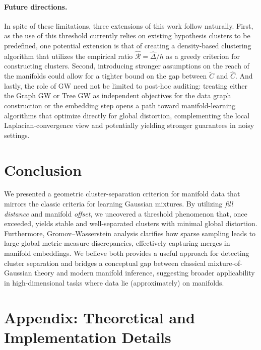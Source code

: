 \documentclass{article}
\theoremstyle{plain}
\theoremstyle{definition}
\theoremstyle{remark}
\begin{document}
\paragraph{Future directions.}
In spite of these limitations, three extensions of this work follow naturally. First, as the use of this threshold currently relies on existing hypothesis clusters to be predefined, one potential extension is that of creating a density-based clustering algorithm that utilizes the empirical ratio \(\widehat{\mathcal{R}}=\widehat{\Delta}/h\) as a greedy criterion for constructing clusters.
Second, introducing stronger assumptions on the reach of the manifolds could allow for a tighter bound on the gap between \(\widetilde{C}\) and \(\widehat{C}\). And lastly, the role of GW need not be limited to post-hoc auditing: treating either the Graph GW or Tree GW as independent objectives for the data graph construction or the embedding step opens a path toward manifold-learning algorithms that optimize directly for global distortion, complementing the local Laplacian-convergence view and potentially yielding stronger guarantees in noisy settings.

\section{Conclusion}
\label{sec:conclusion}

We presented a geometric cluster-separation criterion for manifold data that mirrors the classic criteria for learning Gaussian mixtures. By utilizing \emph{fill distance} and manifold \emph{offset}, we uncovered a threshold phenomenon that, once exceeded, yields stable and well-separated clusters with minimal global distortion. Furthermore, Gromov–Wasserstein analysis clarifies how sparse sampling leads to large global metric-measure discrepancies, effectively capturing merges in manifold embeddings. We believe both provides a useful approach for detecting cluster separation and bridges a conceptual gap between classical mixture-of-Gaussian theory and modern manifold inference, suggesting broader applicability in high-dimensional tasks where data lie (approximately) on manifolds.




\appendix

\section{Appendix: Theoretical and Implementation Details}
\label{app:theory-appendix}
\end{document}

